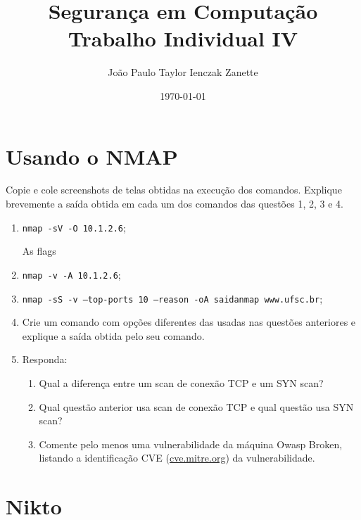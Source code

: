 \documentclass{article}
\title{%
    Segurança em Computação \\
    Trabalho Individual IV
}
\author{João Paulo Taylor Ienczak Zanette}
\date{\today}
\newcommand{\code}[1]{\texttt{#1}}
\begin{document}
    \maketitle{}

    \section{Usando o NMAP}

    \begin{superframe}
        Copie e cole screenshots de telas obtidas na execução dos comandos.
        Explique brevemente a saída obtida em cada um dos comandos das questões
        1, 2, 3 e 4.

        \begin{enumerate}
            \item \texttt{nmap -sV -O 10.1.2.6};

                As flags \code{}
            \item \texttt{nmap -v -A 10.1.2.6};
            \item \texttt{nmap -sS -v --top-ports 10 --reason -oA saidanmap
                www.ufsc.br};
            \item Crie um comando com opções diferentes das usadas nas questões
                anteriores e explique a saída obtida pelo seu comando.
            \item Responda:
                \begin{enumerate}
                    \item Qual a diferença entre um scan de conexão TCP e um
                        SYN scan?
                    \item Qual questão anterior usa scan de conexão TCP e qual
                        questão usa SYN scan?
                    \item Comente pelo menos uma vulnerabilidade da máquina
                        Owasp Broken, listando a identificação CVE
                        (\url{cve.mitre.org}) da vulnerabilidade.
                \end{enumerate}
        \end{enumerate}
    \end{superframe}

    \section{Nikto}
\end{document}
